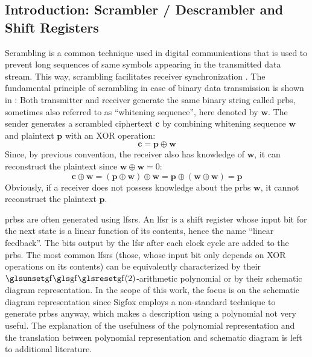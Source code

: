 \subsection{Introduction: Scrambler / Descrambler and Shift Registers}
Scrambling is a common technique used in digital communications that is used to prevent long sequences of same symbols appearing in the transmitted data stream.
This way, scrambling facilitates receiver synchronization \cite[Section 11.4]{carlson_commsys}.
The fundamental principle of scrambling in case of binary data transmission is shown in :
Both transmitter and receiver generate the same binary string called \gls{prbs}, sometimes also referred to as ``whitening sequence'', here denoted by $\mathbf w$.
The sender generates a scrambled ciphertext $\mathbf c$ by combining whitening sequence $\mathbf w$ and plaintext $\mathbf p$ with an XOR operation:
\begin{equation}
	\mathbf c = \mathbf p \oplus \mathbf w
\end{equation}
Since, by previous convention, the receiver also has knowledge of $\mathbf w$, it can reconstruct the plaintext since $\mathbf w \oplus \mathbf w = 0$:
\begin{equation}
	\mathbf c \oplus \mathbf w = (\mathbf p \oplus \mathbf w) \oplus \mathbf w = \mathbf p \oplus (\mathbf w \oplus \mathbf w) = \mathbf p
\end{equation}
Obviously, if a receiver does not possess knowledge about the \gls{prbs} $\mathbf w$, it cannot reconstruct the plaintext $\mathbf p$.

\glspl{prbs} are often generated using \glspl{lfsr}.
An \gls{lfsr} is a shift register whose input bit for the next state is a linear function of its contents, hence the name ``linear feedback''.
The bits output by the \gls{lfsr} after each clock cycle are added to the \gls{prbs}.
The most common \glspl{lfsr} (those, whose input bit only depends on XOR operations on its contents) can be equivalently characterized by their $\GF(2)$-arithmetic polynomial or by their schematic diagram representation.
In the scope of this work, the focus is on the schematic diagram representation since Sigfox employs a non-standard technique to generate \glspl{prbs} anyway, which makes a description using a polynomial not very useful.
The explanation of the usefulness of the polynomial representation and the translation between polynomial representation and schematic diagram is left to additional literature.

